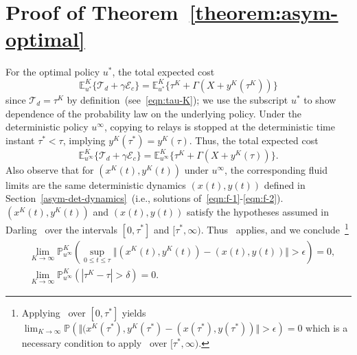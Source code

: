 \documentclass[10pt,journal,letterpaper]{IEEEtran}
\begin{document}
\section{Proof of Theorem~\ref{theorem:asym-optimal}}
\label{proof-asym-optimal}
For the optimal policy $u^{\ast}$, the total expected cost
\begin{equation*}
\mathbb{E}^K_{u^{\ast}}\{\mathcal{T}_d + \gamma\mathcal{E}_c\} = \mathbb{E}^K_{u^{\ast}}\{\tau^K + \Gamma (X + y^K(\tau^K))\}
\end{equation*}
since $\mathcal{T}_d = \tau^K$ by definition~(see~\eqref{eqn:tau-K});
we use the subscript $u^{\ast}$ to show dependence of the probability law on the underlying policy.
Under the deterministic policy $u^{\infty}$, copying to relays is stopped at the deterministic
time instant $\tau^{\ast} < \tau$, implying $y^K(\tau^{\ast})=y^K(\tau)$. Thus, the total expected cost
\begin{equation*}
\mathbb{E}^K_{u^{\infty}}\{\mathcal{T}_d + \gamma\mathcal{E}_c\} =
\mathbb{E}^K_{u^{\infty}}\{\tau^K + \Gamma (X + y^K(\tau))\}.
\end{equation*}
Also observe that for $(x^K(t),y^K(t))$ under $u^{\infty}$, the corresponding fluid limits are
the same deterministic dynamics $(x(t),y(t))$ defined in
Section~\ref{asym-det-dynamics}~(i.e., solutions of~\eqref{eqn:f-1}-\eqref{eqn:f-2}).
$(x^K(t),y^K(t))$ and $(x(t),y(t))$ satisfy the hypotheses assumed in Darling~\cite{stochproc.darling02fluid-limits} over the intervals
$[0,\tau^{\ast}]$ and $[\tau^{\ast},\infty)$. Thus~\cite[Theorem~2.8]{stochproc.darling02fluid-limits}
applies, and we conclude~\footnote{Applying~\cite[Theorem~2.8]{stochproc.darling02fluid-limits} over $[0,\tau^{\ast}]$ yields
$\lim_{K \rightarrow \infty} \mathbb{P}\left(\Vert(x^K(\tau^{\ast}),y^K(\tau^{\ast})
- (x(\tau^{\ast}),y(\tau^{\ast}))\Vert > \epsilon \right) = 0$
which is a necessary condition to apply~\cite[Theorem~2.8]{stochproc.darling02fluid-limits} over $[\tau^{\ast},\infty)$.}
\begin{align*}
&\lim_{K \rightarrow \infty} \mathbb{P}^K_{u^{\infty}}\left(\sup_{0 \leq t \leq \tau}\Vert(x^K(t),y^K(t)) - (x(t),y(t))\Vert > \epsilon \right) = 0, \\
&\lim_{K \rightarrow \infty} \mathbb{P}^K_{u^{\infty}}\left(|\tau^K
- \tau| > \delta \right) = 0.
\end{align*}
\end{document}
